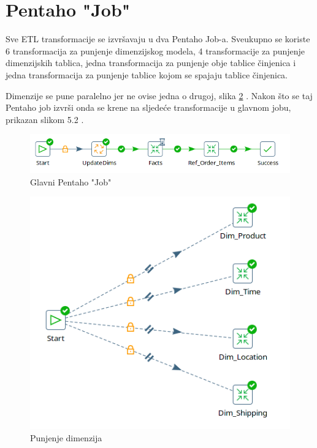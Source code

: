 \documentclass[12pt, oneside]{book}
\begin{document}
\section{Pentaho "Job"}
Sve ETL transformacije se izvršavaju u dva Pentaho Job-a. Sveukupno se koriste 6 transformacija za punjenje dimenzijskog modela, 4 transformacije za punjenje dimenzijskih tablica, jedna transformacija za punjenje obje tablice činjenica i jedna transformacija za punjenje tablice kojom se spajaju tablice činjenica.


Dimenzije se pune paralelno jer ne ovise jedna o drugoj, slika \ref{UpdateDim} . Nakon što se taj Pentaho job izvrši onda se krene na sljedeće transformacije u glavnom jobu, prikazan slikom 5.2 .

\begin{figure}[H]
\label{PentahoUpdateA}
\includegraphics[width=16cm]{images/i10_Pentaho-Update-Facts.png}
\centering
\caption{Glavni Pentaho "Job"}
\end{figure}

\begin{figure}[H]
\label{UpdateDim}
\includegraphics[width=16cm]{images/i09_Pentaho-Update-Dim.png}
\centering
\caption{Punjenje dimenzija}
\end{figure}
\end{document}
